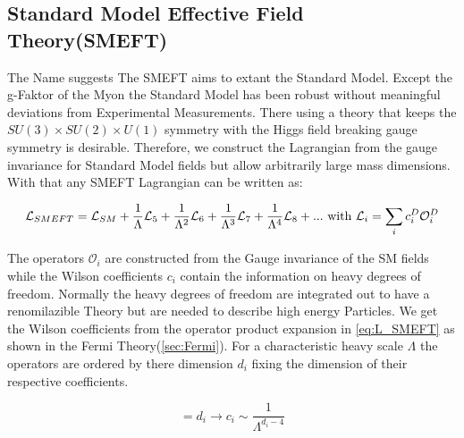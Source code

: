 \documentclass[../Bachelorarbeit.tex]{subfiles}
\begin{document}
\subsection{Standard Model Effective Field Theory(SMEFT)}
The Name suggests The SMEFT aims to extant the Standard Model.
Except the g-Faktor of the Myon the Standard Model has been robust without meaningful deviations from Experimental Measurements.
There using a theory that keeps the $SU(3) \times SU(2) \times U(1)$ symmetry with the Higgs field breaking gauge symmetry is desirable.
Therefore, we construct the Lagrangian from the gauge invariance for Standard Model fields but allow arbitrarily large mass dimensions.
With that any SMEFT Lagrangian can be written as:

\begin{equation}
    \mathcal{L}_{SMEFT} = \mathcal{L}_{SM} + \frac{1}{\Lambda} \mathcal{L}_{5} + \frac{1}{\Lambda^2} \mathcal{L}_{6} + \frac{1}{\Lambda^3} \mathcal{L}_{7} + \frac{1}{\Lambda^4} \mathcal{L}_{8} + ... \textnormal{ with } \mathcal{L}_{i} = \sum_{i} c_{i}^{D} \mathcal{O}_{i}^{D}
    \label{eq:L_SMEFT}
\end{equation}

The operators $\mathcal{O}_{i}$ are constructed from the Gauge invariance of the SM fields while the Wilson coefficients $c_{i}$ contain the information on heavy degrees of freedom.
Normally the heavy degrees of freedom are integrated out to have a renomilazible Theory but are needed to describe high energy Particles.
We get the Wilson coefficients from the operator product expansion in \ref{eq:L_SMEFT} as shown in the Fermi Theory(\ref{sec:Fermi}).
For a characteristic heavy scale $\Lambda$ the operators are ordered by there dimension $d_{i}$ fixing the dimension of their respective coefficients.

\begin{equation}
    [\mathcal{O}_i] = d_{i} \longrightarrow c_{i} \sim \frac{1}{\Lambda^{d_{i}-4}}
\end{equation}
\end{document}
